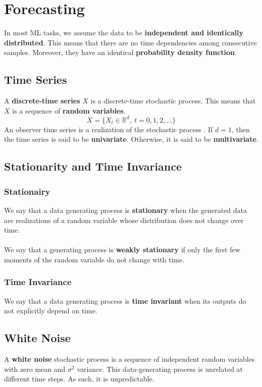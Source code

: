 \documentclass{article}
\begin{document}
\section{Forecasting}
In most ML tasks, we assume the data to be \textbf{independent and identically distributed}. This means that there are no time dependencies among consecutive samples. Moreover, they have an identical \textbf{probability density function}.

\subsection{Time Series}
A \textbf{discrete-time series} $X$ is a discrete-time stochastic process. This means that $X$ is a sequence of \textbf{random variables}.
\[ X = \{ X_t \in \mathbb{R}^d,~t = 0,1,2,\dots \} \]
An observer time series is a realization of the stochastic process . If $d = 1$, then the time series is said to be \textbf{univariate}. Otherwise, it is said to be \textbf{multivariate}.

\subsection{Stationarity and Time Invariance}
\subsubsection{Stationairy}
We say that a data generating process is \textbf{stationary} when the generated data are realizations of a random variable whose distribution does not change over time. \\ \\
We say that a generating process is \textbf{weakly stationary} if only the first few moments of the random variable do not change with time.

\subsubsection{Time Invariance}
We say that a data generating process is \textbf{time invariant} when its outputs do not explicitly depend on time.

\subsection{White Noise}
A \textbf{white noise} stochastic process is a sequence of independent random variables with zero mean and $\sigma^2$ variance. This data-generating process is unrelated at different time steps. As such, it is unpredictable.
\end{document}
